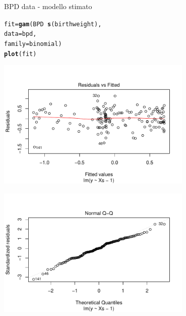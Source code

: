 \documentclass{beamer}\usepackage[]{graphicx}\usepackage[]{color}
\makeatletter
\newcommand{\hlopt}[1]{\textcolor[rgb]{0,0,0}{#1}}%
\newcommand{\hlstd}[1]{\textcolor[rgb]{0.345,0.345,0.345}{#1}}%
\newcommand{\hlkwb}[1]{\textcolor[rgb]{0.69,0.353,0.396}{#1}}%
\newcommand{\hlkwc}[1]{\textcolor[rgb]{0.333,0.667,0.333}{#1}}%
\newcommand{\hlkwd}[1]{\textcolor[rgb]{0.737,0.353,0.396}{\textbf{#1}}}%
\newenvironment{kframe}{%
 \def\at@end@of@kframe{}%
 \ifinner\ifhmode%
  \def\at@end@of@kframe{\end{minipage}}%
  \begin{minipage}{\columnwidth}%
 \fi\fi%
 \def\FrameCommand##1{\hskip\@totalleftmargin \hskip-\fboxsep
 \colorbox{shadecolor}{##1}\hskip-\fboxsep
     \hskip-\linewidth \hskip-\@totalleftmargin \hskip\columnwidth}%
 \MakeFramed {\advance\hsize-\width
   \@totalleftmargin\z@ \linewidth\hsize
   \@setminipage}}%
 {\par\unskip\endMakeFramed%
 \at@end@of@kframe}
\newenvironment{knitrout}{}{} %
\makeatother
\begin{document}
\begin{frame}[fragile]{BPD data - modello stimato}

\begin{knitrout}
\color{fgcolor}\begin{kframe}
\begin{alltt}
\hlstd{fit}\hlkwb{=}\hlkwd{gam}\hlstd{(BPD}\hlopt{~}\hlkwd{s}\hlstd{(birthweight),}
        \hlkwc{data}\hlstd{=bpd,}
        \hlkwc{family}\hlstd{=binomial)}
\hlkwd{plot}\hlstd{(fit)}
\end{alltt}
\end{kframe}
\end{knitrout}

\begin{center}
\begin{knitrout}
\color{fgcolor}\begin{kframe}


{\ttfamily\noindent\bfseries{}}\end{kframe}
\includegraphics[width=0.7\textwidth]{figure/020-regression-1unnamed-chunk-40-1} 

\includegraphics[width=0.7\textwidth]{figure/020-regression-1unnamed-chunk-40-2} 


\end{knitrout}
\end{center}
\end{frame}
\end{document}
